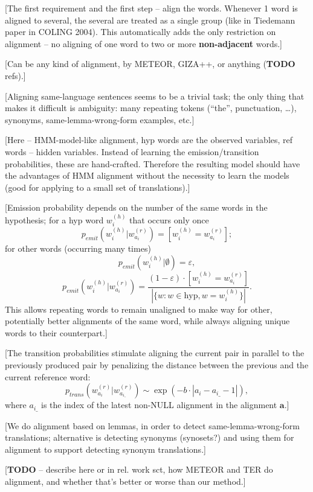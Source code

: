 \documentclass[11pt]{article}
\newcommand{\tmp}[1]{[#1]}
\newcommand{\todo}[0]{\textbf{TODO}}
\begin{document}
\tmp{The first requirement and the first step -- align the words. Whenever 1 word is aligned to several, the several are
treated as a single group (like in Tiedemann paper in COLING 2004). This automatically adds the only restriction on
alignment -- no aligning of one word to two or more \textbf{non-adjacent} words.}

\tmp{Can be any kind of alignment, by METEOR, GIZA++, or anything (\todo{} refs).}

\tmp{Aligning same-language sentences seems to be a trivial task; the only thing that makes it difficult is ambiguity:
many repeating tokens (``the'', punctuation, \dots), synonyms, same-lemma-wrong-form examples, etc.}

\tmp{Here -- HMM-model-like alignment, hyp words are the observed variables, ref words -- hidden variables. Instead of
learning the emission/transition probabilities, these are hand-crafted. Therefore the resulting model should have the
advantages of HMM alignment without the necessity to learn the models (good for applying to a small set of
translations).}

\tmp{Emission probability depends on the number of
the same words in the hypothesis; for a hyp word $w^{(h)}_i$ that occurs only once
\[
	p_{emit}(w^{(h)}_i | w^{(r)}_{a_i}) = [w^{(h)}_i = w^{(r)}_{a_i}];
\]
for other words (occurring many times)
\[
	p_{emit}(w^{(h)}_i | \emptyset) = \varepsilon,
\]
\[
	p_{emit}(w^{(h)}_i|w^{(r)}_{a_i}) = \frac{(1 - \varepsilon) \cdot [w^{(h)}_i = w^{(r)}_{a_i}]}{|\{w: w \in \mbox{hyp}, w = w^{(h)}_i \}|}.
\]
This allows repeating words to remain unaligned to make way for other, potentially better alignments of the same word,
while always aligning unique words to their counterpart.}

\tmp{The transition probabilities stimulate aligning the current pair in parallel to the previously produced pair by
penalizing the distance between the previous and the current reference word:
\[
	p_{trans}(w^{(r)}_{a_i} | w^{(r)}_{a_{i\_}}) \sim \exp(-b \cdot |a_i - a_{i\_} - 1|),
\]
where $a_{i\_}$ is the index of the latest non-NULL alignment in the alignment $\mathbf{a}$.}

\tmp{We do alignment based on lemmas, in order to detect same-lemma-wrong-form translations; alternative is detecting
synonyms (synosets?) and using them for alignment to support detecting synonym translations.}

\tmp{\todo{} -- describe here or in rel. work sct, how METEOR and TER do alignment, and whether that's better or worse
than our method.}
\end{document}
